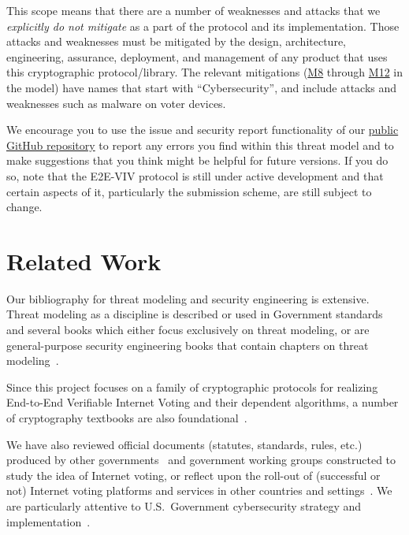 \documentclass[10pt,letterpaper]{article}
\begin{document}
This scope means that there are a number of weaknesses and attacks that we \emph{explicitly do not mitigate} as a part of the protocol and its implementation. Those attacks and weaknesses must be mitigated by the design, architecture, engineering, assurance, deployment, and management of any product that uses this cryptographic protocol/library. The relevant mitigations (\hyperlink{M8}{M8} through \hyperlink{M12}{M12} in the model) have names that start with ``Cybersecurity'', and include attacks and weaknesses such as malware on voter devices.

We encourage you to use the issue and security report functionality of our \href{https://github.com/FreeAndFair/MobileVotingCoreCryptography}{public GitHub repository} to report any errors you find within this threat model and to make suggestions that you think might be helpful for future versions. If you do so, note that the E2E-VIV protocol is still under active development and that certain aspects of it, particularly the submission scheme, are still subject to change.

\section{Related Work}
\label{sec:related_work}

Our bibliography for threat modeling and security engineering is extensive. Threat modeling as a discipline is described or used in Government standards~\cite{JointTaskForceTransformationInitiativeGuideconductingrisk2012} and several books which either focus exclusively on threat modeling, or are general-purpose security engineering books that contain chapters on threat modeling~\cite{ShostackThreatmodelingdesigning2014,TarandachColesThreatModeling2020,SwiderskiThreatModeling2004,AndersonSecurityEngineeringGuide2020,DeogunSecureDesign2019,WoodyCyberSecurityEngineering2016,BishopComputerSecurityArt2018,IdreesModelSystemAdversary2014}.

Since this project focuses on a family of cryptographic protocols for realizing End-to-End Verifiable Internet Voting and their dependent algorithms, a number of cryptography textbooks are also foundational~\cite{FergusonCryptographyEngineeringDesign2010,DanBonehGraduateCourseApplied2023,KatzIntroductionModernCryptography2007}.

We have also reviewed official documents (statutes, standards, rules, etc.) produced by other governments~\cite{AustralianSignalsDirectorateEtAlChoosingSecure,EuroparatStandardsEvoting2018} and government working groups constructed to study the idea of Internet voting, or reflect upon the roll-out of (successful or not) Internet voting platforms and services in other countries and settings~\cite{ElectoralCouncilofAustralia&NewZealandElevenEssential2017,BruterEtAlStudyEVoting2023,BagnatoRecommendationCMREC201752022,AppelCACVoteAnother2024}. We are particularly attentive to U.S.~Government cybersecurity strategy and implementation~\cite{TheWhiteHouseNationalCybersecurity2023,TheWhiteHouseNationalCybersecurity2023a,TheWhiteHouseNationalCybersecurity2024}.
\end{document}
